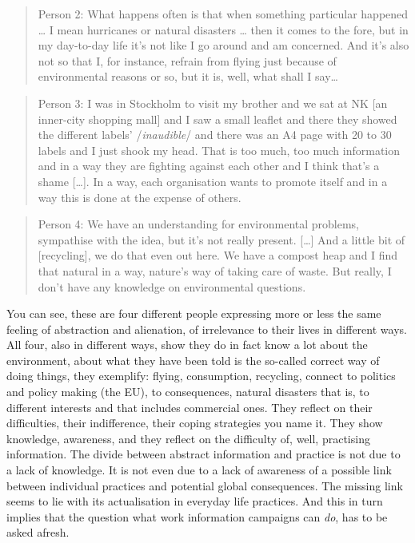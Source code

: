 \documentclass[a4paper,
fontsize=11pt,
oneside,
numbers=noperiodatend,
parskip=half-,
bibliography=totoc,
final
]{scrartcl}
\begin{document}
\begin{quote}
Person 2: What happens often is that when something particular happened
\ldots{} I mean hurricanes or natural disasters \ldots{} then it comes
to the fore, but in my day-to-day life it's not like I go around and am
concerned. And it's also not so that I, for instance, refrain from
flying just because of environmental reasons or so, but it is, well,
what shall I say\ldots{}
\end{quote}

\begin{quote}
Person 3: I was in Stockholm to visit my brother and we sat at NK {[}an
inner-city shopping mall{]} and I saw a small leaflet and there they
showed the different labels' /\emph{inaudible}/ and there was an A4 page
with 20 to 30 labels and I just shook my head. That is too much, too
much information and in a way they are fighting against each other and I
think that's a shame {[}\ldots{}{]}. In a way, each organisation wants
to promote itself and in a way this is done at the expense of others.~
\end{quote}

\begin{quote}
Person 4: We have an understanding for environmental problems,
sympathise with the idea, but it's not really present. {[}\ldots{}{]}
And a little bit of {[}recycling{]}, we do that even out here. We have a
compost heap and I find that natural in a way, nature's way of taking
care of waste. But really, I don't have any knowledge on environmental
questions.
\end{quote}

You can see, these are four different people expressing more or less the
same feeling of abstraction and alienation, of irrelevance to their
lives in different ways. All four, also in different ways, show they do
in fact know a lot about the environment, about what they have been told
is the so-called correct way of doing things, they exemplify: flying,
consumption, recycling, connect to politics and policy making (the EU),
to consequences, natural disasters that is, to different interests and
that includes commercial ones. They reflect on their difficulties, their
indifference, their coping strategies you name it. They show knowledge,
awareness, and they reflect on the difficulty of, well, practising
information. The divide between abstract information and practice is not
due to a lack of knowledge. It is not even due to a lack of awareness of
a possible link between individual practices and potential global
consequences. The missing link seems to lie with its actualisation in
everyday life practices. And this in turn implies that the question what
work information campaigns can \emph{do}, has to be asked afresh.
\end{document}
